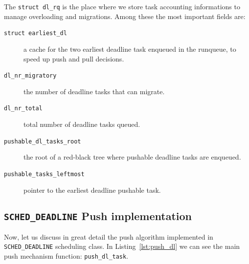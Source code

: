 The \texttt{struct dl\_rq} is the place where we store task accounting
informations to manage overloading and migrations. Among these the most
important fields are:
\begin{description}
\item[\texttt{struct earliest\_dl}] a cache for the two earliest deadline
task enqueued in the runqueue, to speed up push and pull decisions.
\item[\texttt{dl\_nr\_migratory}] the number of deadline tasks that can
migrate.
\item[\texttt{dl\_nr\_total}] total number of deadline tasks queued.
\item[\texttt{pushable\_dl\_tasks\_root}] the root of a red-black tree
where pushable deadline tasks are enqueued.
\item[\texttt{pushable\_tasks\_leftmost}] pointer to the earliest deadline
pushable task.
\end{description}

\subsection{\texttt{SCHED\_DEADLINE} Push implementation\label{sec:push_dl_impl}}
Now, let us discuss in great detail the push algorithm implemented in \texttt{SCHED\_DEADLINE}
scheduling class. In Listing~\ref{lst:push_dl} we can see the main push mechanism 
function: \texttt{push\_dl\_task}.

